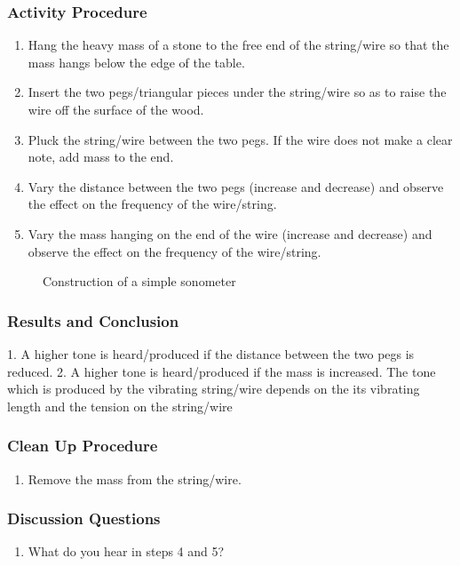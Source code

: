 \subsubsection*{Activity Procedure}
\begin{enumerate}
\item{Hang the heavy mass of a stone to the free end of the string/wire so that the mass hangs below the edge of the table.} 
\item{Insert the two pegs/triangular pieces under the string/wire so as to raise the wire off the surface of the wood.} 
\item{Pluck the string/wire between the two pegs. If the wire does not make a clear note, add mass to the end.} 
\item{Vary the distance between the two pegs (increase and decrease) and observe the effect on the frequency of the wire/string.} 
\item{Vary the mass hanging on the end of the wire (increase and decrease) and observe the effect on the frequency of the wire/string.} 
\end{enumerate}

\begin{figure}
\begin{center}
\def\svgwidth{200pt}

\caption{Construction of a simple sonometer}
\label{fig:sonometert}
\end{center}
\end{figure}

\subsubsection*{Results and Conclusion}
1. A higher tone is heard/produced if the distance between the two pegs is reduced.  
2. A higher tone is heard/produced if the mass is increased.  
The tone which is produced by the vibrating string/wire depends on the its vibrating length and the tension on the string/wire

\subsubsection*{Clean Up Procedure}
\begin{enumerate}
\item{Remove the mass from the string/wire.} 
\end{enumerate}

\subsubsection*{Discussion Questions}
\begin{enumerate}
\item{What do you hear in steps 4 and 5?}
\end{enumerate}

